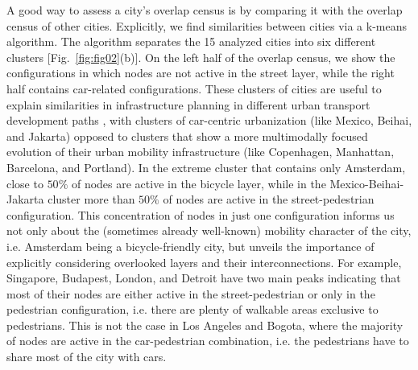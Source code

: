 A good way to assess a city's overlap census is by comparing it with the overlap census of other cities. Explicitly, we find similarities between cities via a k-means algorithm. The algorithm separates the 15 analyzed cities into six different clusters [Fig.~\ref{fig:fig02}(b)]. On the left half of the overlap census, we show the configurations in which nodes are not active in the street layer, while the right half contains car-related configurations. These clusters of cities are useful to explain similarities in infrastructure planning in different urban transport development paths \cite{Rodrigue2013,Louf2014}, with clusters of car-centric urbanization (like Mexico, Beihai, and Jakarta) opposed to clusters that show a more multimodally focused evolution of their urban mobility infrastructure (like Copenhagen, Manhattan, Barcelona, and Portland). In the extreme cluster that contains only Amsterdam, close to $50\%$ of nodes are active in the bicycle layer, while in the Mexico-Beihai-Jakarta cluster more than $50\%$ of nodes are active in the street-pedestrian configuration. This concentration of nodes in just one configuration informs us not only about the (sometimes already well-known) mobility character of the city, i.e. Amsterdam being a bicycle-friendly city, but unveils the importance of explicitly considering overlooked layers and their interconnections. For example, Singapore, Budapest, London, and Detroit have two main peaks indicating that most of their nodes are either active in the street-pedestrian or only in the pedestrian configuration, i.e. there are plenty of walkable areas exclusive to pedestrians. This is not the case in Los Angeles and Bogota, where the majority of nodes are active in the car-pedestrian combination, i.e. the pedestrians have to share most of the city with cars.